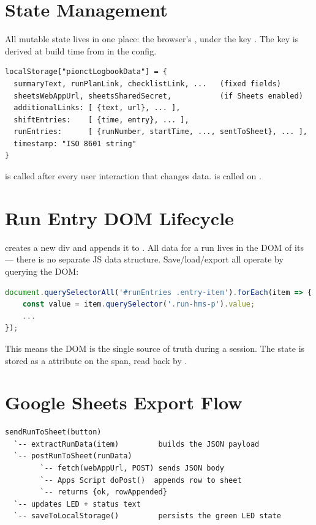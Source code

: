 \section{State Management}

All mutable state lives in one place: the browser's ,
under the key . The key is
derived at build time from  in the config.

\begin{lstlisting}
localStorage["pionctLogbookData"] = {
  summaryText, runPlanLink, checklistLink, ...   (fixed fields)
  sheetsWebAppUrl, sheetsSharedSecret,           (if Sheets enabled)
  additionalLinks: [ {text, url}, ... ],
  shiftEntries:    [ {time, entry}, ... ],
  runEntries:      [ {runNumber, startTime, ..., sentToSheet}, ... ],
  timestamp: "ISO 8601 string"
}
\end{lstlisting}

 is called after every user interaction that
changes data.  is called on
.

\section{Run Entry DOM Lifecycle}

 creates a new  div and appends it to
. All data for a run lives in the DOM of its
 --- there is no separate JS data structure.
Save/load/export all operate by querying the DOM:

\begin{lstlisting}[language=javascript]
document.querySelectorAll('#runEntries .entry-item').forEach(item => {
    const value = item.querySelector('.run-hms-p').value;
    ...
});
\end{lstlisting}

This means the DOM is the single source of truth during a session. The
 state is stored as a  attribute on the
 span, read back by .

\section{Google Sheets Export Flow}

\begin{lstlisting}
sendRunToSheet(button)
  `-- extractRunData(item)         builds the JSON payload
  `-- postRunToSheet(runData)
        `-- fetch(webAppUrl, POST) sends JSON body
        `-- Apps Script doPost()  appends row to sheet
        `-- returns {ok, rowAppended}
  `-- updates LED + status text
  `-- saveToLocalStorage()         persists the green LED state
\end{lstlisting}


